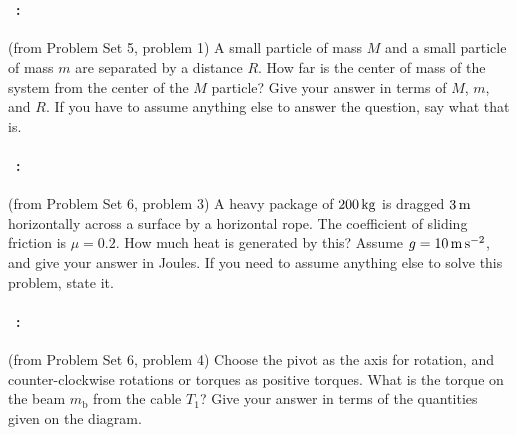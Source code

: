 \documentclass[12pt]{article}
\begin{document}
\vfill
~
\clearpage
\paragraph{\problemname~\theproblem:}%
(from Problem Set 5, problem 1) A small particle of mass $M$ and a small particle of mass
$m$ are separated by a distance $R$. How far is the center of mass of
the system from the center of the $M$ particle? Give your answer in terms of
$M$, $m$, and $R$. If you have to assume anything else to answer the
question, say what that is.

\vfill

\paragraph{\problemname~\theproblem:}%
(from Problem Set 6, problem 3) A heavy package of $200\,\mathrm{kg}$ is
dragged $3\,\mathrm{m}$ horizontally across a surface by a horizontal
rope. The coefficient of sliding friction is $\mu = 0.2$. How much
heat is generated by this?  Assume $g = 10\,\mathrm{m}\,\mathrm{s}^{-2}$, and give your
answer in Joules. If you need to assume anything else to solve this
problem, state it.

\vfill

\paragraph{\problemname~\theproblem:}%
(from Problem Set 6, problem 4) Choose the pivot as the axis for
rotation, and counter-clockwise rotations or torques as positive
torques. What is the torque on the beam $m_\mathrm{b}$ from the cable $T_1$?
Give your answer in terms of the quantities given on the diagram.

\vfill
~
\end{document}
